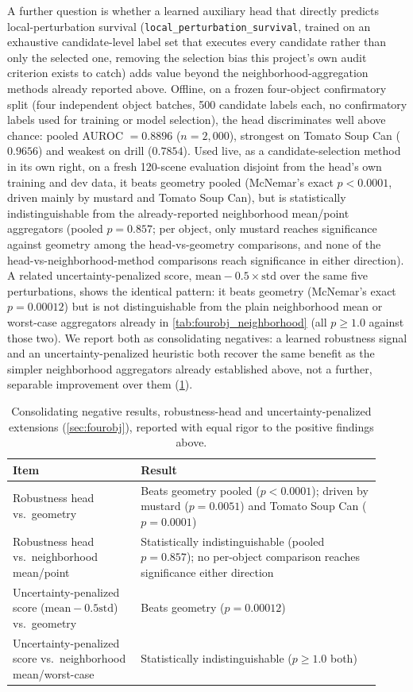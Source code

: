 \documentclass[journal]{IEEEtran}
\begin{document}
A further question is whether a learned auxiliary head that directly
predicts local-perturbation survival (\texttt{local\_perturbation\_survival},
trained on an exhaustive candidate-level label set that executes every
candidate rather than only the selected one, removing the selection bias
this project's own audit criterion exists to catch) adds value beyond the
neighborhood-aggregation methods already reported above. Offline, on a
frozen four-object confirmatory split (four independent object batches,
500 candidate labels each, no confirmatory labels used for training or
model selection), the head discriminates well above chance: pooled AUROC
$=0.8896$ ($n=2{,}000$), strongest on Tomato Soup Can ($0.9656$) and
weakest on drill ($0.7854$). Used live, as a candidate-selection method in
its own right, on a fresh 120-scene evaluation disjoint from the head's
own training and dev data, it beats geometry pooled (McNemar's exact
$p<0.0001$, driven mainly by mustard and Tomato Soup Can), but is
statistically indistinguishable from the already-reported neighborhood
mean/point aggregators (pooled $p=0.857$; per object, only mustard reaches
significance against geometry among the head-vs-geometry comparisons, and
none of the head-vs-neighborhood-method comparisons reach significance in
either direction). A related uncertainty-penalized score,
$\mathrm{mean}-0.5{\times}\mathrm{std}$ over the same five perturbations,
shows the identical pattern: it beats geometry (McNemar's exact
$p=0.00012$) but is not distinguishable from the plain neighborhood mean or
worst-case aggregators already in \cref{tab:fourobj_neighborhood} (all
$p\geq1.0$ against those two). We report both as consolidating negatives:
a learned robustness signal and an uncertainty-penalized heuristic both
recover the same benefit as the simpler neighborhood aggregators already
established above, not a further, separable improvement over them
(\cref{tab:fourobj_negative}).

\begin{table}[t]
\centering
\caption{Consolidating negative results, robustness-head and uncertainty-penalized extensions (\cref{sec:fourobj}), reported with equal rigor to the positive findings above.}
\label{tab:fourobj_negative}
\small
\begin{tabular}{@{}p{0.32\linewidth}p{0.6\linewidth}@{}}
\toprule
Item & Result \\
\midrule
Robustness head vs.\ geometry & Beats geometry pooled ($p{<}0.0001$); driven by mustard ($p{=}0.0051$) and Tomato Soup Can ($p{=}0.0001$) \\
Robustness head vs.\ neighborhood mean/point & Statistically indistinguishable (pooled $p{=}0.857$); no per-object comparison reaches significance either direction \\
Uncertainty-penalized score ($\mathrm{mean}-0.5\mathrm{std}$) vs.\ geometry & Beats geometry ($p{=}0.00012$) \\
Uncertainty-penalized score vs.\ neighborhood mean/worst-case & Statistically indistinguishable ($p\geq1.0$ both) \\
\bottomrule
\end{tabular}
\end{table}
\end{document}
